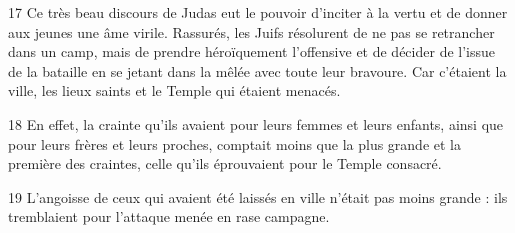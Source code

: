 
17 Ce très beau discours de Judas eut le pouvoir d’inciter à la vertu et de donner aux jeunes une âme virile. Rassurés, les Juifs résolurent de ne pas se retrancher dans un camp, mais de prendre héroïquement l’offensive et de décider de l’issue de la bataille en se jetant dans la mêlée avec toute leur bravoure. Car c’étaient la ville, les lieux saints et le Temple qui étaient menacés.

18 En effet, la crainte qu’ils avaient pour leurs femmes et leurs enfants, ainsi que pour leurs frères et leurs proches, comptait moins que la plus grande et la première des craintes, celle qu’ils éprouvaient pour le Temple consacré.

19 L’angoisse de ceux qui avaient été laissés en ville n’était pas moins grande : ils tremblaient pour l’attaque menée en rase campagne.